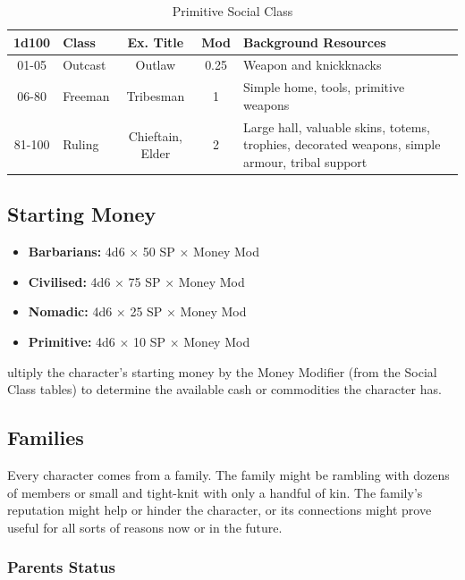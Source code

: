 \documentclass[10pt]{article}
\begin{document}
\begin{longtable}{|c|l|c|c|p{7cm}|}
\caption{Primitive Social Class}
\label{tab:primitive-social-class}\\
\hline
\textbf{1d100} & \textbf{Class} & \textbf{Ex. Title} & \textbf{Mod} & \textbf{Background Resources} \\
\hline
01-05 & Outcast & Outlaw & 0.25 & Weapon and knickknacks \\
\hline
06-80 & Freeman & Tribesman & 1 & Simple home, tools, primitive weapons \\
\hline
81-100 & Ruling & Chieftain, Elder & 2 & Large hall, valuable skins, totems, trophies, decorated weapons, simple armour, tribal support \\
\hline
\end{longtable}

\subsection{Starting Money}
\label{sec:starting-money}

\begin{itemize}
    \item \textbf{Barbarians:} 4d6 × 50 SP × Money Mod
    \item \textbf{Civilised:} 4d6 × 75 SP × Money Mod
    \item \textbf{Nomadic:} 4d6 × 25 SP × Money Mod
    \item \textbf{Primitive:} 4d6 × 10 SP × Money Mod
\end{itemize}

ultiply the character's starting money by the Money Modifier (from the Social Class tables) to determine the available cash or commodities the character has.

\subsection{Families}
\label{sec:families}

Every character comes from a family. The family might be rambling with dozens of members or small and tight-knit with only a handful of kin. The family's reputation might help or hinder the character, or its connections might prove useful for all sorts of reasons now or in the future.

\subsubsection{Parents Status}
\end{document}
